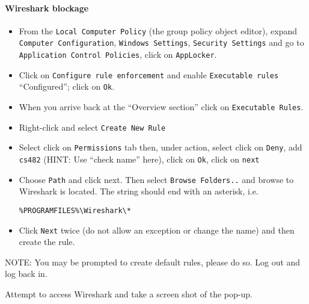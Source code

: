 \documentclass{article}
\begin{document}
\paragraph{Wireshark blockage}
\begin{itemize}
\item From the {\tt Local Computer Policy} (the group policy object editor), expand {\tt Computer Configuration}, {\tt Windows Settings}, {\tt Security Settings} and go to {\tt Application Control Policies}, click on {\tt AppLocker}. 
\item Click on {\tt Configure rule enforcement} and enable {\tt Executable rules} ``Configured''; click on {\tt Ok}. 
\item When you arrive back at the ``Overview section'' click on {\tt Executable Rules}. 
\item Right-click and select {\tt Create New Rule}
\item Select click on {\tt Permissions} tab then, under action, select click on {\tt Deny}, add {\tt cs482} (HINT: Use ``check name'' here), click on {\tt Ok}, click on {\tt next}
\item Choose {\tt Path} and click next. Then select {\tt Browse Folders..} and browse to Wireshark is located.  The string should end with an asterisk, i.e. 
\begin{verbatim}
%PROGRAMFILES%\Wireshark\*
\end{verbatim}
\item Click {\tt Next} twice (do not allow an exception or change the name) and then create the rule.
\end{itemize}
NOTE: You may be prompted to create default rules, please do so.  Log out and log back in.  

\question Attempt to access Wireshark and take a screen shot of the pop-up.
\end{document}
